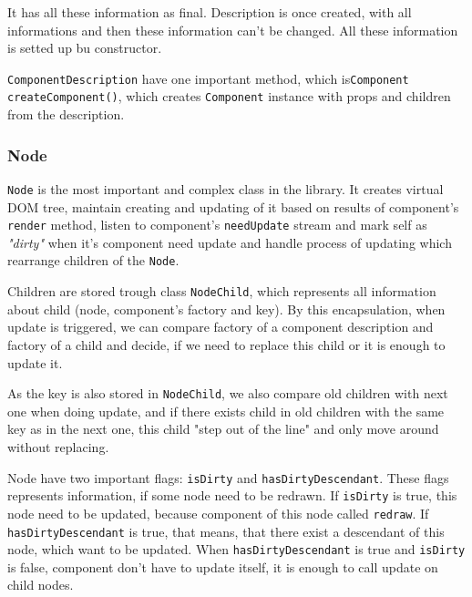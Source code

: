       It has all these information as final. Description is once created, 
      with all informations and then these information can't be changed. 
      All these information is setted up bu constructor. 

      \texttt{ComponentDescription} have one important method, which is\texttt{Component createComponent()}, 
      which creates \texttt{Component} instance with props and children from the description.

    \subsubsection{Node}\label{subsubsec:our-architecture-core-node}
      \texttt{Node} is the most important and complex class in the library.
      It creates virtual DOM tree, maintain creating and updating of it based on results of component's \texttt{render} method, 
      listen to component's \texttt{needUpdate} stream and mark self as \textit{"dirty"} when it's component need update 
      and handle process of updating which rearrange children of the \texttt{Node}.

      Children are stored trough class \texttt{NodeChild}, which represents all information about child (node, component's factory and key). 
      By this encapsulation, when update is triggered, we can compare factory of a component description and factory of a child 
      and decide, if we need to replace this child or it is enough to update it. 

      As the key is also stored in \texttt{NodeChild}, we also compare old children with next one when doing update, 
      and if there exists child in old children with the same key as in the next one, this child "step out of the line" 
      and only move around without replacing.
      
      Node have two important flags: \texttt{isDirty} and \texttt{hasDirtyDescendant}. 
      These flags represents information, if some node need to be redrawn.
      If \texttt{isDirty} is true, this node need to be updated, 
      because component of this node called \texttt{redraw}.
      If \texttt{hasDirtyDescendant} is true, that means, 
      that there exist a descendant of this node, which want to be updated.
      When \texttt{hasDirtyDescendant} is true and \texttt{isDirty} is false, 
      component don't have to update itself, it is enough to call update on child nodes.

